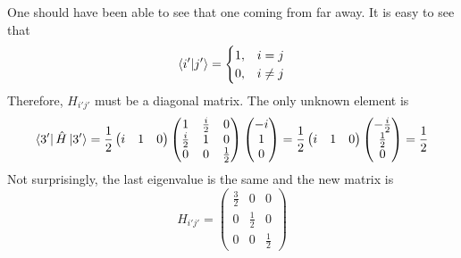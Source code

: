 \documentclass{article}
\newcommand*\colvec[3][]{
    \begin{pmatrix}\ifx\relax#1\relax\else#1\\\fi#2\\#3\end{pmatrix}
}
\begin{document}
One should have been able to see that one coming from far away. It is easy to see that 
\begin{equation}
\braket{i'}{j'}=
\begin{cases}
1, & i=j\\
0, & i\neq j
\end{cases}
\end{equation}
Therefore, $H_{i'j'}$ must be a diagonal matrix. The only unknown element is
\begin{equation}
\bra{3'}\hat{H}\ket{3'}=
\frac{1}{2}\begin{pmatrix}
i & 1 & 0
\end{pmatrix}\begin{pmatrix}
1 & \frac{i}{2} & 0 \\
\frac{i}{2} & 1 & 0 \\
0 & 0 & \frac{1}{2}
\end{pmatrix}
\colvec[-i]{1}{0}=
\frac{1}{2}\begin{pmatrix}
i & 1 & 0
\end{pmatrix}
\colvec[-\frac{i}{2}]{\frac{1}{2}}{0}=\frac{1}{2}
\end{equation}
Not surprisingly, the last eigenvalue is the same and the new matrix is
\begin{equation}
H_{i'j'}=\begin{pmatrix}
\frac{3}{2} & 0 & 0 \\
0 & \frac{1}{2} & 0 \\
0 & 0 & \frac{1}{2}
\end{pmatrix}
\end{equation}
\end{document}
